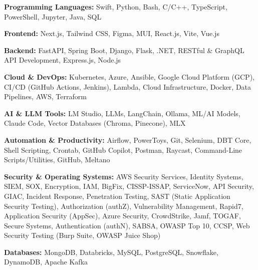 \textbf{Programming Languages:} Swift, Python, Bash, C/C++, TypeScript, PowerShell, Jupyter, Java, SQL
\vspace{3pt}

\textbf{Frontend:} Next.js, Tailwind CSS, Figma, MUI, React.js, Vite, Vue.js
\vspace{3pt}

\textbf{Backend:} FastAPI, Spring Boot, Django, Flask, .NET, RESTful \& GraphQL API Development, Express.js, Node.js
\vspace{3pt}

\textbf{Cloud \& DevOps:} Kubernetes, Azure, Ansible, Google Cloud Platform (GCP), CI/CD (GitHub Actions, Jenkins), Lambda, Cloud Infrastructure, Docker, Data Pipelines, AWS, Terraform
\vspace{3pt}

\textbf{AI \& LLM Tools:} LM Studio, LLMs, LangChain, Ollama, ML/AI Models, Claude Code, Vector Databases (Chroma, Pinecone), MLX
\vspace{3pt}

\textbf{Automation \& Productivity:} Airflow, PowerToys, Git, Selenium, DBT Core, Shell Scripting, Crontab, GitHub Copilot, Postman, Raycast, Command-Line Scripts/Utilities, GitHub, Meltano
\vspace{3pt}

\textbf{Security \& Operating Systems:} AWS Security Services, Identity Systems, SIEM, SOX, Encryption, IAM, BigFix, CISSP-ISSAP, ServiceNow, API Security, GIAC, Incident Response, Penetration Testing, SAST (Static Application Security Testing), Authorization (authZ), Vulnerability Management, Rapid7, Application Security (AppSec), Azure Security, CrowdStrike, Jamf, TOGAF, Secure Systems, Authentication (authN), SABSA, OWASP Top 10, CCSP, Web Security Testing (Burp Suite, OWASP Juice Shop)
\vspace{3pt}

\textbf{Databases:} MongoDB, Databricks, MySQL, PostgreSQL, Snowflake, DynamoDB, Apache Kafka